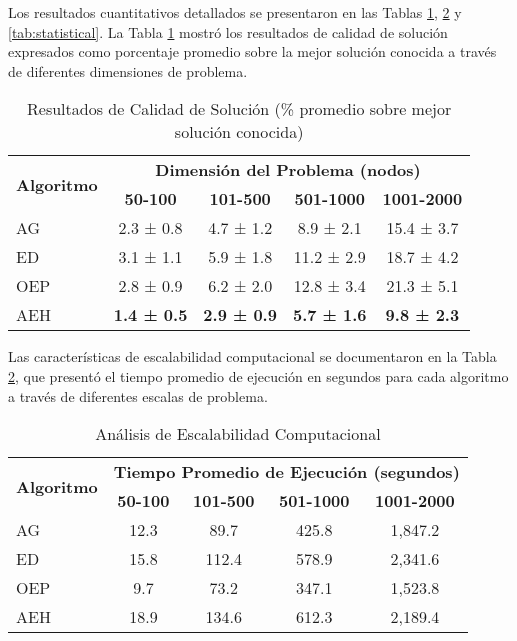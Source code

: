 \documentclass[12pt,a4paper]{article}
\begin{document}
Los resultados cuantitativos detallados se presentaron en las Tablas \ref{tab:results_quality}, \ref{tab:scalability} y \ref{tab:statistical}. La Tabla \ref{tab:results_quality} mostró los resultados de calidad de solución expresados como porcentaje promedio sobre la mejor solución conocida a través de diferentes dimensiones de problema.

\begin{table}[H]
\centering
\caption{Resultados de Calidad de Solución (\% promedio sobre mejor solución conocida)}
\begin{tabular}{@{}lcccc@{}}
\toprule
\multirow{2}{*}{\textbf{Algoritmo}} & \multicolumn{4}{c}{\textbf{Dimensión del Problema (nodos)}} \\
\cmidrule(r){2-5}
& \textbf{50-100} & \textbf{101-500} & \textbf{501-1000} & \textbf{1001-2000} \\
\midrule
AG & 2.3 ± 0.8 & 4.7 ± 1.2 & 8.9 ± 2.1 & 15.4 ± 3.7 \\
ED & 3.1 ± 1.1 & 5.9 ± 1.8 & 11.2 ± 2.9 & 18.7 ± 4.2 \\
OEP & 2.8 ± 0.9 & 6.2 ± 2.0 & 12.8 ± 3.4 & 21.3 ± 5.1 \\
AEH & \textbf{1.4 ± 0.5} & \textbf{2.9 ± 0.9} & \textbf{5.7 ± 1.6} & \textbf{9.8 ± 2.3} \\
\bottomrule
\end{tabular}
\label{tab:results_quality}
\end{table}

Las características de escalabilidad computacional se documentaron en la Tabla \ref{tab:scalability}, que presentó el tiempo promedio de ejecución en segundos para cada algoritmo a través de diferentes escalas de problema.

\begin{table}[H]
\centering
\caption{Análisis de Escalabilidad Computacional}
\begin{tabular}{@{}lcccc@{}}
\toprule
\multirow{2}{*}{\textbf{Algoritmo}} & \multicolumn{4}{c}{\textbf{Tiempo Promedio de Ejecución (segundos)}} \\
\cmidrule(r){2-5}
& \textbf{50-100} & \textbf{101-500} & \textbf{501-1000} & \textbf{1001-2000} \\
\midrule
AG & 12.3 & 89.7 & 425.8 & 1,847.2 \\
ED & 15.8 & 112.4 & 578.9 & 2,341.6 \\
OEP & 9.7 & 73.2 & 347.1 & 1,523.8 \\
AEH & 18.9 & 134.6 & 612.3 & 2,189.4 \\
\bottomrule
\end{tabular}
\label{tab:scalability}
\end{table}
\end{document}
